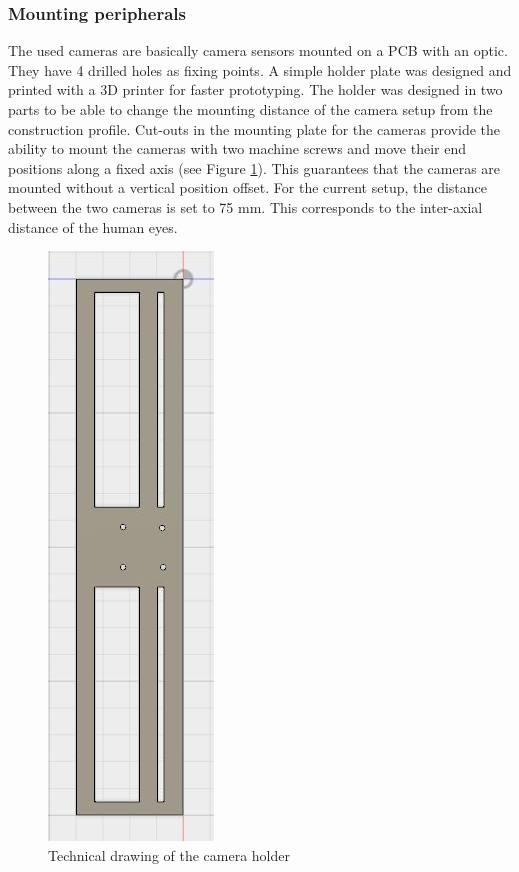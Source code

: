 \subsubsection{Mounting peripherals}
The used cameras are basically camera sensors mounted on a PCB with an optic. They have 4 drilled holes as fixing points. A simple holder plate was designed and printed with a 3D printer for faster prototyping. The holder was designed in two parts to be able to change the mounting distance of the camera setup from the construction profile. Cut-outs in the mounting plate for the cameras provide the ability to mount the cameras with two machine screws and move their end positions along a fixed axis (see Figure \ref{img:camera_holder}). This guarantees that the cameras are mounted without a vertical position offset. For the current setup, the distance between the two cameras is set to 75 mm. This corresponds to the inter-axial distance of the human eyes.
\begin{figure}[H]
\includegraphics[height=\textwidth, angle=90]{images/CAmera_holder_2.JPG}
\caption{Technical drawing of the camera holder}
\label{img:camera_holder} 
\end{figure}
